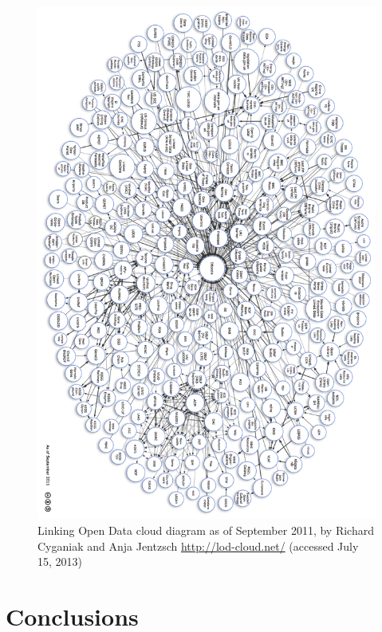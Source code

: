 \begin{figure}[!h]
\centering  \includegraphics[height=0.87\textheight,keepaspectratio]{lod-cloud.png}
  \caption[Linking Open Data cloud diagram as of September 2011]
  {Linking Open Data cloud diagram as of September 2011, by Richard Cyganiak and Anja Jentzsch \url{http://lod-cloud.net/} (accessed July 15, 2013) }
  \label{fig:lod-cloud}
\end{figure}

\section{Conclusions}

